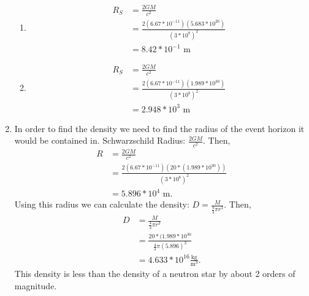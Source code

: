 \documentclass{article}
\begin{document}
\begin{enumerate}
\begin{enumerate}
        \item
        
        \begin{align*}
            R_S &= \frac{2GM}{c^2}\\
            &= \frac{2(6.67*10^{-11})(5.683*10^{26})}{(3*10^8)^2}\\
            &= 8.42*10^{-1}\text{ m}
        \end{align*}
        
        \item
        
        \begin{align*}
            R_S &= \frac{2GM}{c^2}\\
            &= \frac{2(6.67*10^{-11})(1.989*10^{30})}{(3*10^8)^2}\\
            &= 2.948*10^3\text{ m}
        \end{align*}
        
    \end{enumerate}
    
    \item
    
    In order to find the density we need to find the radius of the event horizon it would be contained in. Schwarzschild Radius: $\frac{2GM}{c^2}$. Then,
    \begin{align*}
        R &= \frac{2GM}{c^2}\\
        &= \frac{2(6.67*10^{-11})(20*(1.989*10^{30}))}{(3*10^8)^2}\\
        &= 5.896*10^4\text{ m}.
    \end{align*} Using this radius we can calculate the density: $D=\frac{M}{\frac{4}{3}\pi r^3}$. Then,
    \begin{align*}
        D &= \frac{M}{\frac{4}{3}\pi r^3}\\
        &= \frac{20*(1.989*10^{30}}{\frac{4}{3}\pi(5.896)^3}\\
        &= 4.633*10^{16} \frac{\text{kg}}{\text{m}^3}.
    \end{align*} This density is less than the density of a neutron star by about 2 orders of magnitude. 
    
\end{enumerate}
\end{document}
